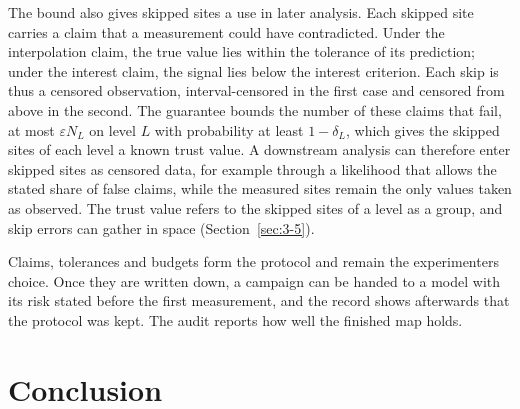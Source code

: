 \documentclass{iopjournal}
\begin{document}
The bound also gives skipped sites a use in later analysis. Each skipped site carries a claim that a measurement could have contradicted. Under the interpolation claim, the true value lies within the tolerance of its prediction; under the interest claim, the signal lies below the interest criterion. Each skip is thus a censored observation, interval-censored in the first case and censored from above in the second. The guarantee bounds the number of these claims that fail, at most \(\varepsilon N_L\) on level \(L\) with probability at least \(1 - \delta_L\), which gives the skipped sites of each level a known trust value. A downstream analysis can therefore enter skipped sites as censored data, for example through a likelihood that allows the stated share of false claims, while the measured sites remain the only values taken as observed. The trust value refers to the skipped sites of a level as a group, and skip errors can gather in space (Section~\ref{sec:3-5}).

Claims, tolerances and budgets form the protocol and remain the experimenter\textquotesingle s choice. Once they are written down, a campaign can be handed to a model with its risk stated before the first measurement, and the record shows afterwards that the protocol was kept. The audit reports how well the finished map holds.

\hypertarget{sec:7}{%
\section{Conclusion}\label{sec:7}}
\end{document}
